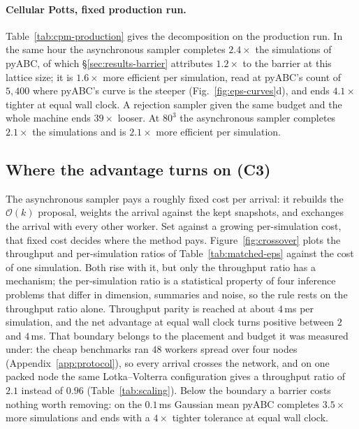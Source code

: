 \documentclass[10pt]{article}
\theoremstyle{plain}
\theoremstyle{definition}
\begin{document}
\paragraph{Cellular Potts, fixed production run.} Table~\ref{tab:cpm-production} gives the decomposition on the production run. In the same hour the asynchronous sampler completes $2.4\times$ the simulations of pyABC, of which \S\ref{sec:results-barrier} attributes $1.2\times$ to the barrier at this lattice size; it is $1.6\times$ more efficient per simulation, read at pyABC's count of $5{,}400$ where pyABC's curve is the steeper (Fig.~\ref{fig:eps-curves}d), and ends $4.1\times$ tighter at equal wall clock. A rejection sampler given the same budget and the whole machine ends $39\times$ looser. At $80^3$ the asynchronous sampler completes $2.1\times$ the simulations and is $2.1\times$ more efficient per simulation.
\subsection{Where the advantage turns on (C3)}\label{sec:results-boundary}

The asynchronous sampler pays a roughly fixed cost per arrival: it rebuilds the $\mathcal{O}(k)$ proposal, weights the arrival against the kept snapshots, and exchanges the arrival with every other worker. Set against a growing per-simulation cost, that fixed cost decides where the method pays. Figure~\ref{fig:crossover} plots the throughput and per-simulation ratios of Table~\ref{tab:matched-eps} against the cost of one simulation. Both rise with it, but only the throughput ratio has a mechanism; the per-simulation ratio is a statistical property of four inference problems that differ in dimension, summaries and noise, so the rule rests on the throughput ratio alone. Throughput parity is reached at about $4$\,ms per simulation, and the net advantage at equal wall clock turns positive between $2$ and $4$\,ms. That boundary belongs to the placement and budget it was measured under: the cheap benchmarks ran $48$ workers spread over four nodes (Appendix~\ref{app:protocol}), so every arrival crosses the network, and on one packed node the same Lotka--Volterra configuration gives a throughput ratio of $2.1$ instead of $0.96$ (Table~\ref{tab:scaling}). Below the boundary a barrier costs nothing worth removing: on the $0.1$\,ms Gaussian mean pyABC completes $3.5\times$ more simulations and ends with a $4\times$ tighter tolerance at equal wall clock.
\end{document}
